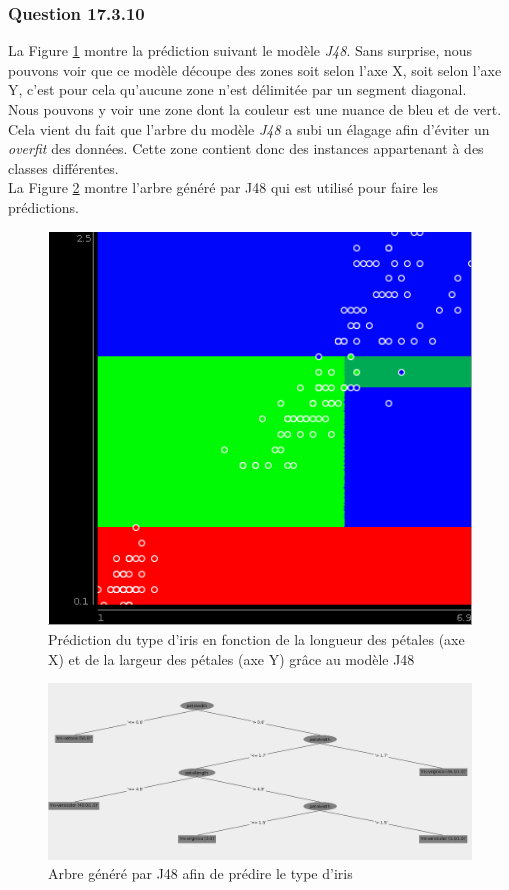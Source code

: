\documentclass[11pt,a4paper]{article}
\begin{document}
			\subsubsection*{Question 17.3.10}
			
			La Figure \ref{fig:iris:J48} montre la prédiction suivant le modèle \textit{J48}. Sans surprise, nous pouvons voir que ce modèle découpe des zones soit selon l'axe X, soit selon l'axe Y, c'est pour cela qu'aucune zone n'est délimitée par un segment diagonal.\\
			
			Nous pouvons y voir une zone dont la couleur est une nuance de bleu et de vert. Cela vient du fait que l'arbre du modèle \textit{J48} a subi un élagage afin d'éviter un \textit{overfit} des données. Cette zone contient donc des instances appartenant à des classes différentes.\\
			
			La Figure \ref{fig:iris:J48:tree} montre l'arbre généré par J48 qui est utilisé pour faire les prédictions.
			
			\begin{figure}[h]
				\centering
				\includegraphics[width=.5\textwidth]{iris_J48}
				\caption{Prédiction du type d'iris en fonction de la longueur des pétales (axe X) et de la largeur des pétales (axe Y) grâce au modèle J48}
				\label{fig:iris:J48}
			\end{figure}
			
			\begin{figure}[h]
				\centering
				\includegraphics[width=\textwidth]{iris_J48_tree}
				\caption{Arbre généré par J48 afin de prédire le type d'iris}
				\label{fig:iris:J48:tree}
			\end{figure}
   	
\end{document}
